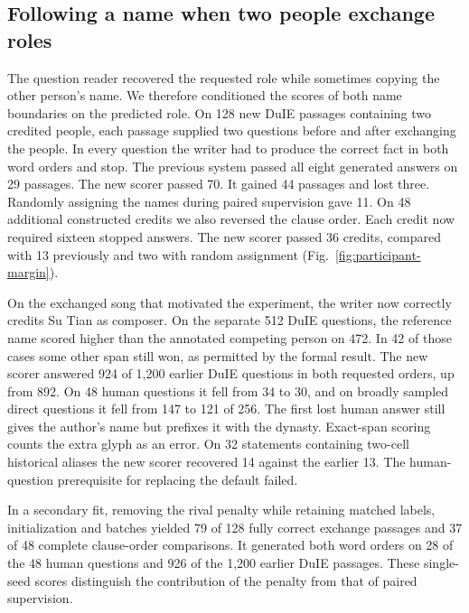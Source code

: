 \subsection*{Following a name when two people exchange roles}
The question reader recovered the requested role while sometimes copying the other person's name. We therefore conditioned the scores of both name boundaries on the predicted role. On 128 new DuIE passages containing two credited people, each passage supplied two questions before and after exchanging the people. In every question the writer had to produce the correct fact in both word orders and stop. The previous system passed all eight generated answers on 29 passages. The new scorer passed 70. It gained 44 passages and lost three. Randomly assigning the names during paired supervision gave 11. On 48 additional constructed credits we also reversed the clause order. Each credit now required sixteen stopped answers. The new scorer passed 36 credits, compared with 13 previously and two with random assignment (Fig.~\ref{fig:participant-margin}).

On the exchanged song that motivated the experiment, the writer now correctly credits Su Tian as composer. On the separate 512 DuIE questions, the reference name scored higher than the annotated competing person on 472. In 42 of those cases some other span still won, as permitted by the formal result. The new scorer answered 924 of 1,200 earlier DuIE questions in both requested orders, up from 892. On 48 human questions it fell from 34 to 30, and on broadly sampled direct questions it fell from 147 to 121 of 256. The first lost human answer still gives the author's name but prefixes it with the dynasty. Exact-span scoring counts the extra glyph as an error. On 32 statements containing two-cell historical aliases the new scorer recovered 14 against the earlier 13. The human-question prerequisite for replacing the default failed.

In a secondary fit, removing the rival penalty while retaining matched labels, initialization and batches yielded 79 of 128 fully correct exchange passages and 37 of 48 complete clause-order comparisons. It generated both word orders on 28 of the 48 human questions and 926 of the 1,200 earlier DuIE passages. These single-seed scores distinguish the contribution of the penalty from that of paired supervision.
